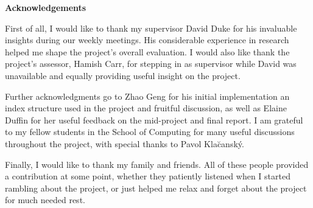 \begin{center}
    {\LARGE\bf Acknowledgements}
\end{center}

First of all, I would like to thank my supervisor David Duke for his invaluable insights during our weekly meetings. His considerable experience in research helped me shape the project's overall evaluation. I would also like thank the project's assessor, Hamish Carr, for stepping in as supervisor while David was unavailable and equally providing useful insight on the project.

Further acknowledgments go to  Zhao Geng for his initial implementation an index structure used in the project and fruitful discussion, as well as Elaine Duffin for her useful feedback on the mid-project and final report. I am grateful to my fellow students in the School of Computing for many useful discussions throughout the project, with special thanks to Pavol Kla\u{c}ansk\'{y}.


Finally, I would like to thank my family and friends. All of these people provided a contribution at some point, whether they patiently listened when I started rambling about the project, or just helped me relax and forget about the project for much needed rest.

